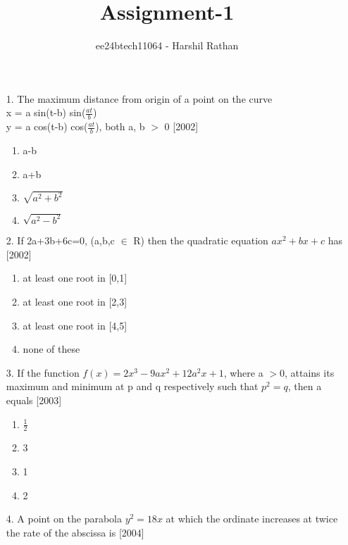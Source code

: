 \documentclass[journal,12pt,twocolumn]{IEEEtran}
\theoremstyle{remark}
\begin{document}

\vspace{3cm}

\title{Assignment-1}
\author{ee24btech11064 - Harshil Rathan}
\maketitle
\newpage
\bigskip

\renewcommand{\thefigure}{\theenumi}
\renewcommand{\thetable}{\theenumi}
\begin{enumerate}
\item[1.]The maximum distance from origin of a point on the curve\\ x = a sin(t-b) sin($\frac{at}{b}$)\\ y = a cos(t-b) cos($\frac{at}{b}$), both a, b $>$ 0 \hfill{[2002]}
\begin{enumerate}
    \item a-b
        \item a+b
	    \item $\sqrt{a^2+b^2}$
	        \item $\sqrt{a^2-b^2}$  \\
		\end{enumerate}
		\item[2.]If 2a+3b+6c=0, (a,b,c $\in$ R) then the quadratic equation $ax^2+bx+c$ has \hfill{[2002]}
		\begin{enumerate}
		    \item at least one root in [0,1]
		        \item at  least one root in [2,3]
			    \item at least one root in [4,5]
			        \item none of these \\
				\end{enumerate}
				\item[3.]If the function $f(x)=2x^3-9ax^2+12a^2x+1$, where a $>$0, attains its maximum and minimum at p and q respectively such that $p
				    ^2=q$, then a equals  \hfill{[2003]}
				    \begin{enumerate}
				           \item $\frac{1}{2}$
					          \item 3
						         \item 1
							        \item 2
								\end{enumerate}
								\item[4.]A point on the parabola $y^2=18x$ at which the ordinate increases at twice the rate of the abscissa is \hfill{[2004]}

\end{enumerate}
\end{document}
